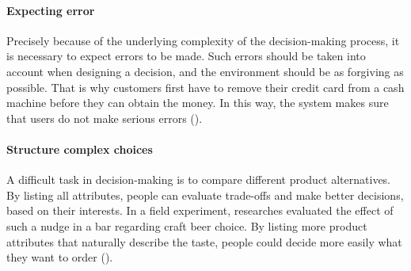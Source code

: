 \paragraph{Expecting error}
Precisely because of the underlying complexity of the decision-making process, it is necessary to expect errors to be made. Such errors should be taken into account when designing a decision, and the environment should be as forgiving as possible. That is why customers first have to remove their credit card from a cash machine before they can obtain the money. In this way, the system makes sure that users do not make serious errors (\cite{weinmann_digital_2016}).
\paragraph{Structure complex choices}
A difficult task in decision-making is to compare different product alternatives. By listing all attributes, people can evaluate trade-offs and make better decisions, based on their interests. In a field experiment, researches evaluated the effect of such a nudge in a bar regarding craft beer choice. By listing more product attributes that naturally describe the taste, people could decide more easily what they want to order (\cite{malone_excessive_2017}).


